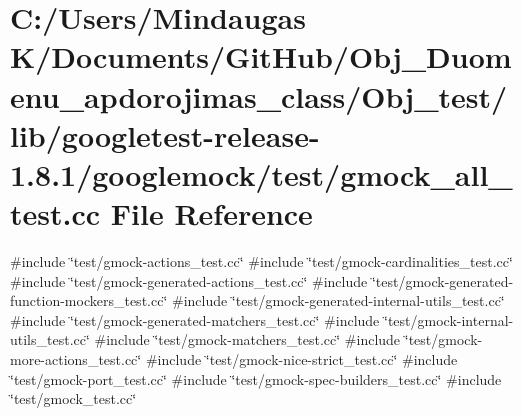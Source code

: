 \hypertarget{_obj__test_2lib_2googletest-release-1_88_81_2googlemock_2test_2gmock__all__test_8cc}{}\section{C\+:/\+Users/\+Mindaugas K/\+Documents/\+Git\+Hub/\+Obj\+\_\+\+Duomenu\+\_\+apdorojimas\+\_\+class/\+Obj\+\_\+test/lib/googletest-\/release-\/1.8.1/googlemock/test/gmock\+\_\+all\+\_\+test.cc File Reference}
\label{_obj__test_2lib_2googletest-release-1_88_81_2googlemock_2test_2gmock__all__test_8cc}
{\ttfamily \#include \char`\"{}test/gmock-\/actions\+\_\+test.\+cc\char`\"{}}\newline
{\ttfamily \#include \char`\"{}test/gmock-\/cardinalities\+\_\+test.\+cc\char`\"{}}\newline
{\ttfamily \#include \char`\"{}test/gmock-\/generated-\/actions\+\_\+test.\+cc\char`\"{}}\newline
{\ttfamily \#include \char`\"{}test/gmock-\/generated-\/function-\/mockers\+\_\+test.\+cc\char`\"{}}\newline
{\ttfamily \#include \char`\"{}test/gmock-\/generated-\/internal-\/utils\+\_\+test.\+cc\char`\"{}}\newline
{\ttfamily \#include \char`\"{}test/gmock-\/generated-\/matchers\+\_\+test.\+cc\char`\"{}}\newline
{\ttfamily \#include \char`\"{}test/gmock-\/internal-\/utils\+\_\+test.\+cc\char`\"{}}\newline
{\ttfamily \#include \char`\"{}test/gmock-\/matchers\+\_\+test.\+cc\char`\"{}}\newline
{\ttfamily \#include \char`\"{}test/gmock-\/more-\/actions\+\_\+test.\+cc\char`\"{}}\newline
{\ttfamily \#include \char`\"{}test/gmock-\/nice-\/strict\+\_\+test.\+cc\char`\"{}}\newline
{\ttfamily \#include \char`\"{}test/gmock-\/port\+\_\+test.\+cc\char`\"{}}\newline
{\ttfamily \#include \char`\"{}test/gmock-\/spec-\/builders\+\_\+test.\+cc\char`\"{}}\newline
{\ttfamily \#include \char`\"{}test/gmock\+\_\+test.\+cc\char`\"{}}\newline
